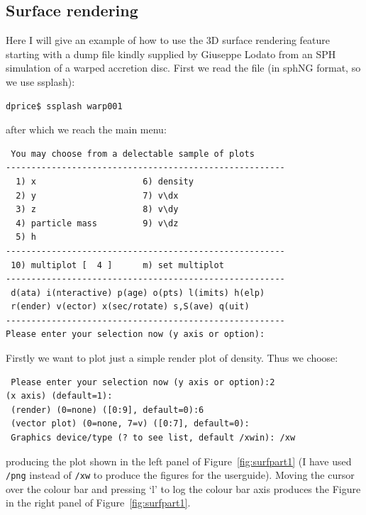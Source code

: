 \documentclass[a4paper,11pt]{article}
\begin{document}
\subsection{Surface rendering}
 Here I will give an example of how to use the 3D surface rendering feature starting with a dump file kindly supplied by Giuseppe Lodato from an SPH simulation of a warped accretion disc. First we read the file (in sphNG format, so we use ssplash):
\begin{verbatim}
dprice$ ssplash warp001
\end{verbatim}
after which we reach the main menu:
\begin{verbatim}
 You may choose from a delectable sample of plots 
-------------------------------------------------------
  1) x                     6) density             
  2) y                     7) v\dx                
  3) z                     8) v\dy                
  4) particle mass         9) v\dz                
  5) h                   
-------------------------------------------------------
 10) multiplot [  4 ]      m) set multiplot 
-------------------------------------------------------
 d(ata) i(nteractive) p(age) o(pts) l(imits) h(elp)
 r(ender) v(ector) x(sec/rotate) s,S(ave) q(uit)
-------------------------------------------------------
Please enter your selection now (y axis or option):
\end{verbatim}
 Firstly we want to plot just a simple render plot of density. Thus we choose:
\begin{verbatim}
 Please enter your selection now (y axis or option):2
(x axis) (default=1):
 (render) (0=none) ([0:9], default=0):6
 (vector plot) (0=none, 7=v) ([0:7], default=0):
 Graphics device/type (? to see list, default /xwin): /xw
\end{verbatim} 
producing the plot shown in the left panel of Figure~\ref{fig:surfpart1} (I have used \verb+/png+ instead of \verb+/xw+ to produce the figures for the userguide). Moving the cursor over the colour bar and pressing `l' to log the colour bar axis produces the Figure in the right panel of Figure~\ref{fig:surfpart1}.
\end{document}
